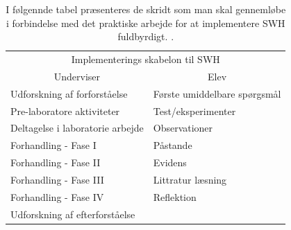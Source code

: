 \begin{table}
	\centering
	\caption[Faser i SWH]{I følgennde tabel præsenteres de skridt som man skal gennemløbe i forbindelse med det praktiske arbejde for at implementere SWH fuldbyrdigt. 
	\citet{Hand2004, Keys1999}.}
	\label{tbl:2.2}
	\begin{tabular}{@{ } l l @{ }}
		\toprule[2.5pt]
			\multicolumn{2}{c}{Implementerings skabelon til SWH}\\
			\multicolumn{1}{c}{Underviser} & \multicolumn{1}{c}{Elev}\\
		\midrule[1.25pt]
			Udforskning af forforståelse 	& Første umiddelbare spørgsmål\\
			Pre-laboratore aktiviteter 		& Test/eksperimenter\\
			Deltagelse i laboratorie arbejde 	& Observationer\\
			Forhandling - Fase I 			& Påstande\\
			Forhandling - Fase II			& Evidens\\
			Forhandling - Fase III			& Littratur læsning\\
			Forhandling - Fase IV			& Reflektion\\
			Udforskning af efterforståelse	& \\
		\bottomrule[2.5pt]
	\end{tabular}
\end{table}

